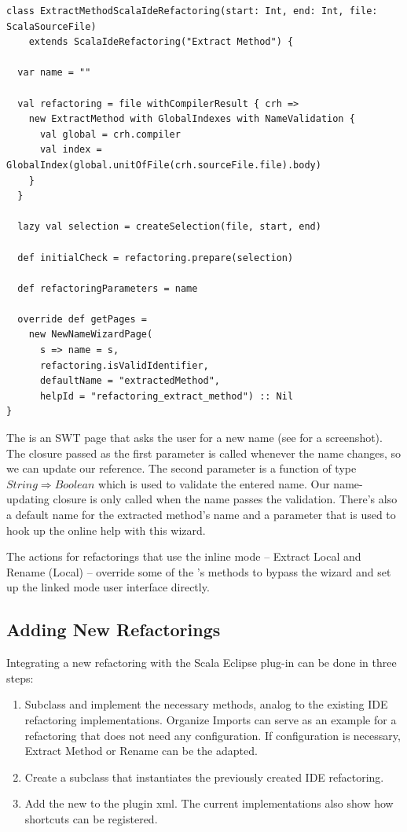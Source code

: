 \documentclass[10pt,a4paper,oneside]{scrreprt}
\begin{document}
\newpage
\begin{lstlisting}
class ExtractMethodScalaIdeRefactoring(start: Int, end: Int, file: ScalaSourceFile) 
    extends ScalaIdeRefactoring("Extract Method") {
  
  var name = ""
  
  val refactoring = file withCompilerResult { crh => 
    new ExtractMethod with GlobalIndexes with NameValidation {
      val global = crh.compiler
      val index = GlobalIndex(global.unitOfFile(crh.sourceFile.file).body)
    }
  }

  lazy val selection = createSelection(file, start, end)

  def initialCheck = refactoring.prepare(selection)
  
  def refactoringParameters = name
  
  override def getPages = 
    new NewNameWizardPage(
      s => name = s, 
      refactoring.isValidIdentifier, 
      defaultName = "extractedMethod",
      helpId = "refactoring_extract_method") :: Nil 
}
\end{lstlisting}

The  is an SWT page that asks the user for a new name (see  for a screenshot). The closure passed as the first parameter is called whenever the name changes, so we can update our reference. The second parameter is a function of type $String \Rightarrow Boolean$ which is used to validate the entered name. Our name-updating closure is only called when the name passes the validation. There's also a default name for the extracted method's name and a  parameter that is used to hook up the online help with this wizard.

The actions for refactorings that use the inline mode -- Extract Local and Rename (Local) -- override some of the 's methods to bypass the wizard and set up the linked mode user interface directly.

\subsection{Adding New Refactorings}

Integrating a new refactoring with the Scala Eclipse plug-in can be done in three steps:

\begin{enumerate}
  \item Subclass  and implement the necessary methods, analog to the existing IDE refactoring implementations. Organize Imports can serve as an example for a refactoring that does not need any configuration. If configuration is necessary, Extract Method or Rename can be the adapted.
  \item Create a  subclass that instantiates the previously created IDE refactoring.
  \item Add the new  to the plugin xml. The current implementations also show how shortcuts can be registered.
\end{enumerate}
\end{document}
